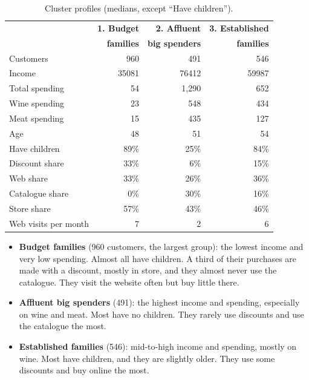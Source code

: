 \documentclass[11pt,a4paper]{article}
\begin{document}
\begin{table}[H]
	\centering
	\small
	\begin{tabular}{lrrr}
		\toprule
		                     & \textbf{1. Budget} & \textbf{2. Affluent}  & \textbf{3. Established} \\
		                     & \textbf{families}  & \textbf{big spenders} & \textbf{families}       \\
		\midrule
		Customers            & 960                & 491                   & 546                     \\
		Income               & \num{35081}        & \num{76412}           & \num{59987}             \\
		Total spending       & 54                 & 1,290                 & 652                     \\
		Wine spending        & 23                 & 548                   & 434                     \\
		Meat spending        & 15                 & 435                   & 127                     \\
		Age                  & 48                 & 51                    & 54                      \\
		Have children        & 89\%               & 25\%                  & 84\%                    \\
		Discount share       & 33\%               & 6\%                   & 15\%                    \\
		Web share            & 33\%               & 26\%                  & 36\%                    \\
		Catalogue share      & 0\%                & 30\%                  & 16\%                    \\
		Store share          & 57\%               & 43\%                  & 46\%                    \\
		Web visits per month & 7                  & 2                     & 6                       \\
		\bottomrule
	\end{tabular}
	\caption{Cluster profiles (medians, except ``Have children'').}
	\label{tab:clusters}
\end{table}

\begin{itemize}
	\item \textbf{Budget families} (960 customers, the largest group): the lowest income and very low spending. Almost all have children. A third of their purchases are made with a discount, mostly in store, and they almost never use the catalogue. They visit the website often but buy little there.
	\item \textbf{Affluent big spenders} (491): the highest income and spending, especially on wine and meat. Most have no children. They rarely use discounts and use the catalogue the most.
	\item \textbf{Established families} (546): mid-to-high income and spending, mostly on wine. Most have children, and they are slightly older. They use some discounts and buy online the most.
\end{itemize}
\end{document}
